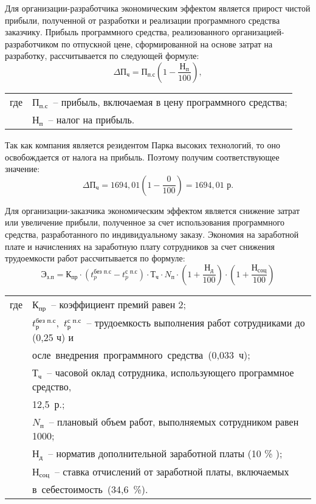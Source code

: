 Для организации-разработчика экономическим эффектом является прирост чистой прибыли, полученной от разработки и реализации программного средства заказчику.
Прибыль программного средства, реализованного организацией-разработчиком по отпускной цене, сформированной на основе затрат на разработку, рассчитывается по следующей формуле:
\begin{equation}
	\label{eq:clean_profit}   
	\Delta 	\mathrm{П_{ч}} = \mathrm{П_{п.с}} \left( 1 - \frac{	\mathrm{Н_{п}}}{100} \right),
\end{equation}

\noindent\begin{tabular}{ll}
	где& \mbox{$\text{П}_{\text{п.с}}$ --} прибыль, включаемая в цену программного средства; \\
	& \mbox{$\text{Н}_{\text{п}}$ --} налог на прибыль.\\

\end{tabular}



 
 Так как компания является резидентом Парка высоких технологий, то оно освобождается от налога на прибыль. Поэтому получим соответствующее значение:
\[
\Delta \mathrm{П_{ч}} = 1694{,}01 \left(1 - \frac{0}{100}\right) = 1694{,}01 \text{ р}.
\]

Для организации-заказчика экономическим эффектом является снижение затрат или увеличение прибыли, полученное за счет использования программного средства, разработанного по индивидуальному заказу. Экономия на заработной плате и начислениях на заработную плату сотрудников за счет снижения трудоемкости работ рассчитывается по формуле:
\begin{equation}
	\label{eq:savings_salary}
	\mathrm{Э_{з.п}} = \mathrm{К_{пр}} \cdot (t_p^{\text{без п.с}} - t_p^{\text{с п.с}}) \cdot \mathrm{Т_{ч}} \cdot N_{\text{п}} \cdot \left(1 + \frac{\mathrm{Н_{д}}}{100}\right) \cdot \left(1 + \frac{\mathrm{Н_{соц}}}{100}\right)
\end{equation}

\noindent\begin{tabular}{ll}
	где& \mbox{$\mathrm{К_{пр}}$ --} коэффициент премий равен 2; \\
	& \mbox{$t_\text{р}^{\text{без п.с}}$, $t_\text{р}^{\text{с п.с}}$ --} трудоемкость выполнения работ сотрудниками до (0,25 ч) и \\
	& \mbox{осле внедрения программного средства (0,033 ч);} \\
	& \mbox{$\text{Т}_{\text{ч}}$  --}  часовой оклад сотрудника, использующего программное средство, \\
	& \mbox{12,5 р.;} \\
	& \mbox{$N_{\text{п}}$ --} плановый объем работ, выполняемых сотрудником равен 1000;\\
	& \mbox{$\mathrm{Н_{д}}$ --} норматив дополнительной заработной платы (10 \% );\\
	& \mbox{$\mathrm{Н_{соц}}$ --} ставка отчислений от заработной платы, включаемых\\
	& \mbox{в себестоимость (34,6 \%).} \\
\end{tabular}



